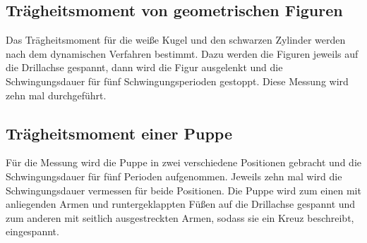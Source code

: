 \subsection{Trägheitsmoment von geometrischen Figuren}
Das Trägheitsmoment für die weiße Kugel und den schwarzen Zylinder werden nach dem dynamischen Verfahren bestimmt. Dazu werden die Figuren jeweils auf die Drillachse gespannt,
dann wird die Figur ausgelenkt und die Schwingungsdauer für fünf Schwingungsperioden gestoppt. Diese Messung wird zehn mal durchgeführt.

\subsection{Trägheitsmoment einer Puppe}
Für die Messung wird die Puppe in zwei verschiedene Positionen gebracht und die Schwingungsdauer für fünf Perioden aufgenommen.
Jeweils zehn mal wird die Schwingungsdauer vermessen für beide Positionen. Die Puppe wird zum einen mit anliegenden Armen und runtergeklappten Füßen auf die Drillachse gespannt
und zum anderen mit seitlich ausgestreckten Armen, sodass sie ein Kreuz beschreibt, eingespannt.
